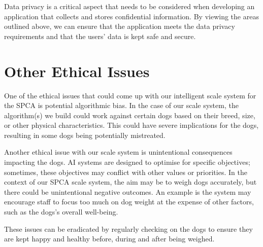 Data privacy is a critical aspect that needs to be considered when developing an application that collects and stores confidential information. By viewing the areas outlined above, we can ensure that the application meets the data privacy requirements and that the users' data is kept safe and secure.


\section{Other Ethical Issues}

One of the ethical issues that could come up with our intelligent scale system for the SPCA is potential algorithmic bias. In the case of our scale system, the algorithm(s) we build could work against certain dogs based on their breed, size, or other physical characteristics. This could have severe implications for the dogs, resulting in some dogs being potentially mistreated.

Another ethical issue with our scale system is unintentional consequences impacting the dogs. AI systems are designed to optimise for specific objectives; sometimes, these objectives may conflict with other values or priorities. In the context of our SPCA scale system, the aim may be to weigh dogs accurately, but there could be unintentional negative outcomes. An example is the system may encourage staff to focus too much on dog weight at the expense of other factors, such as the dogs's overall well-being.

These issues can be eradicated by regularly checking on the dogs to ensure they are kept happy and healthy before, during and after being weighed.


